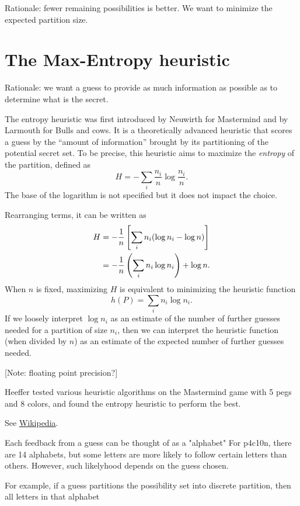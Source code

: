 Rationale: fewer remaining possibilities is better. We want to minimize the expected partition size.

\section{The Max-Entropy heuristic}

Rationale: we want a guess to provide as much information as possible as to determine what is the secret.

The entropy heuristic was first introduced by Neuwirth \cite{neuwirth81} for Mastermind and by Larmouth \cite{aleph71} for Bulls and cows. It is a theoretically advanced heuristic that scores a guess by the ``amount of information'' brought by its partitioning of the potential secret set. To be precise, this heuristic aims to maximize the \emph{entropy} of the partition, defined as
\[
H = -\sum_i \frac{n_i}{n} \log \frac{n_i}{n} .
\]
The base of the logarithm is not specified but it does not impact the choice. 

Rearranging terms, it can be written as
\begin{align}
H 
&= - \frac{1}{n} \left[ \sum_i n_i (\log n_i - \log n ) \right] \notag \\
&= - \frac{1}{n} \left( \sum_i n_i \log n_i \right) + \log n . \notag
\end{align}
When $n$ is fixed, maximizing $H$ is equivalent to minimizing the heuristic function
\[
h(P) = \sum_i n_i \log n_i .
\]
If we loosely interpret $\log n_i$ as an estimate of the number of further guesses needed for a partition of size $n_i$, then we can interpret the heuristic function (when divided by $n$) as an estimate of the expected number of further guesses needed. 

[Note: floating point precision?]

Heeffer \cite{heeffer07} tested various heuristic algorithms on the Mastermind game with 5 pegs and 8 colors, and found the entropy heuristic to perform the best.

See \href{http://en.wikipedia.org/wiki/Entropy\_(information\_theory)\#Further\_properties}{Wikipedia}.

Each feedback from a guess can be thought of as a "alphabet"
For p4c10n, there are 14 alphabets, but some letters are more likely to follow certain letters than others. However, such likelyhood depends on the guess chosen.

For example, if a guess partitions the possibility set into discrete partition, then all letters in that alphabet 

